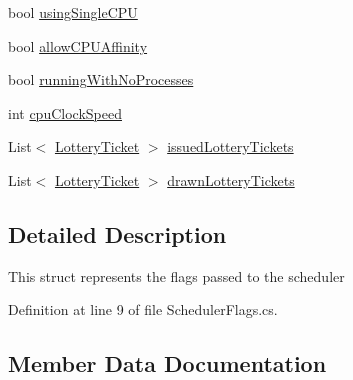\begin{DoxyCompactItemize}
\item 
bool \hyperlink{struct_c_p_u___o_s___simulator_1_1_operating___system_1_1_scheduler_flags_a7b42d8ef49035b7d450032a1e4060fb6}{using\+Single\+C\+P\+U}
\item 
bool \hyperlink{struct_c_p_u___o_s___simulator_1_1_operating___system_1_1_scheduler_flags_ad2d1f81a34e9cce1553bfdf8e8a719ea}{allow\+C\+P\+U\+Affinity}
\item 
bool \hyperlink{struct_c_p_u___o_s___simulator_1_1_operating___system_1_1_scheduler_flags_a1a46dce1e8818f1dae579c00eed21ad1}{running\+With\+No\+Processes}
\item 
int \hyperlink{struct_c_p_u___o_s___simulator_1_1_operating___system_1_1_scheduler_flags_a3ce064f3abe5ac1762f0e7bbfab2eee5}{cpu\+Clock\+Speed}
\item 
List$<$ \hyperlink{class_c_p_u___o_s___simulator_1_1_operating___system_1_1_lottery_ticket}{Lottery\+Ticket} $>$ \hyperlink{struct_c_p_u___o_s___simulator_1_1_operating___system_1_1_scheduler_flags_afb4de8c16fd93a7e44acddfa4c2484f2}{issued\+Lottery\+Tickets}
\item 
List$<$ \hyperlink{class_c_p_u___o_s___simulator_1_1_operating___system_1_1_lottery_ticket}{Lottery\+Ticket} $>$ \hyperlink{struct_c_p_u___o_s___simulator_1_1_operating___system_1_1_scheduler_flags_a215ea3393e8df669cbe8c2133ba768c8}{drawn\+Lottery\+Tickets}
\end{DoxyCompactItemize}


\subsection{Detailed Description}
This struct represents the flags passed to the scheduler 



Definition at line 9 of file Scheduler\+Flags.\+cs.



\subsection{Member Data Documentation}
\hypertarget{struct_c_p_u___o_s___simulator_1_1_operating___system_1_1_scheduler_flags_ad2d1f81a34e9cce1553bfdf8e8a719ea}{}
